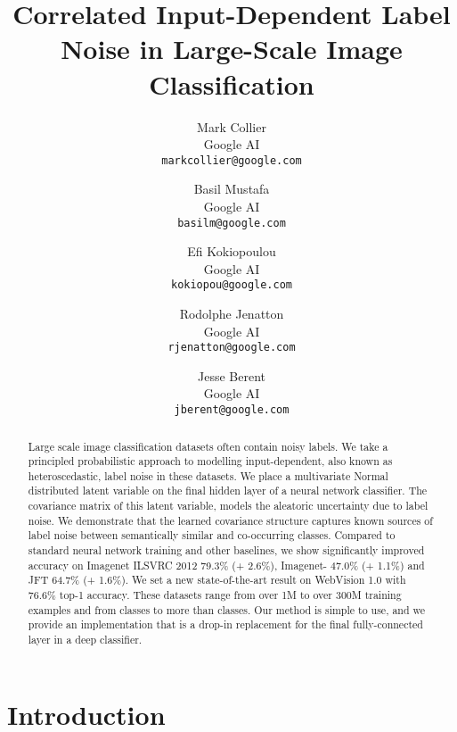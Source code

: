 \documentclass[final]{cvpr}
\begin{document}
\title{Correlated Input-Dependent Label Noise in Large-Scale Image Classification}

\author{Mark Collier\\
Google AI\\
{\tt\small markcollier@google.com}
\and
Basil Mustafa\\
Google AI\\
{\tt\small basilm@google.com}
\and
Efi Kokiopoulou\\
Google AI\\
{\tt\small kokiopou@google.com}
\and
Rodolphe Jenatton\\
Google AI\\
{\tt\small rjenatton@google.com}
\and
Jesse Berent\\
Google AI\\
{\tt\small jberent@google.com}
}

\maketitle


\begin{abstract}
   Large scale image classification datasets often contain noisy labels. We take a principled probabilistic approach to modelling input-dependent, also known as heteroscedastic, label noise in these datasets. We place a multivariate Normal distributed latent variable on the final hidden layer of a neural network classifier. The covariance matrix of this latent variable, models the aleatoric uncertainty due to label noise. We demonstrate that the learned covariance structure captures known sources of label noise between semantically similar and co-occurring classes. Compared to standard neural network training and other baselines, we show significantly improved accuracy on Imagenet ILSVRC 2012 79.3\% (+ 2.6\%), Imagenet- 47.0\% (+ 1.1\%) and JFT 64.7\% (+ 1.6\%). We set a new state-of-the-art result on WebVision 1.0 with 76.6\% top-1 accuracy. These datasets range from over 1M to over 300M training examples and from  classes to more than  classes. Our method is simple to use, and we provide an implementation that is a drop-in replacement for the final fully-connected layer in a deep classifier.
\end{abstract}

\FloatBarrier

\section{Introduction}
\end{document}
